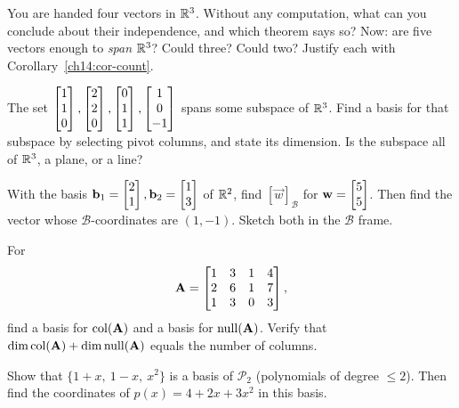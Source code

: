 \begin{exercise}
\label{ch14:exr-count}
You are handed four vectors in $\mathbb{R}^3$. Without any computation, what can you
conclude about their independence, and which theorem says so? Now: are five
vectors enough to \emph{span} $\mathbb{R}^3$? Could three? Could two? Justify each with
Corollary~\ref{ch14:cor-count}.
\end{exercise}

\begin{exercise}
\label{ch14:exr-trim}
The set $\begin{bmatrix}1\\1\\0\end{bmatrix},\begin{bmatrix}2\\2\\0\end{bmatrix},\begin{bmatrix}0\\1\\1\end{bmatrix},\begin{bmatrix}1\\0\\-1\end{bmatrix}$
spans some subspace of $\mathbb{R}^3$. Find a basis for that subspace by selecting pivot
columns, and state its dimension. Is the subspace all of $\mathbb{R}^3$, a plane, or a
line?
\end{exercise}

\begin{exercise}[Coordinates]
\label{ch14:exr-coords}
With the basis $\mathbf{b}_1=\begin{bmatrix}2\\1\end{bmatrix},\mathbf{b}_2=\begin{bmatrix}1\\3\end{bmatrix}$ of $\mathbb{R}^2$, find
$[\vec{w}]_{\mathcal B}$ for $\mathbf{w}=\begin{bmatrix}5\\5\end{bmatrix}$. Then find the vector whose
$\mathcal B$-coordinates are $(1,-1)$. Sketch both in the $\mathcal B$ frame.
\end{exercise}

\begin{exercise}
\label{ch14:exr-both}
For
\[
  \mathbf{A}=\begin{bmatrix} 1 & 3 & 1 & 4\\ 2 & 6 & 1 & 7\\ 1 & 3 & 0 & 3\end{bmatrix},
\]
find a basis for $\operatorname{col}(\mathbf{A})$ and a basis for $\operatorname{null}(\mathbf{A})$. Verify that
$\operatorname{dim}\operatorname{col}(\mathbf{A}) + \operatorname{dim}\operatorname{null}(\mathbf{A})$ equals the number of columns.
\end{exercise}

\begin{exercise}
\label{ch14:exr-poly}
Show that $\{1+x,\ 1-x,\ x^2\}$ is a basis of $\mathcal P_2$ (polynomials of
degree $\le 2$). Then find the coordinates of $p(x) = 4 + 2x + 3x^2$ in this
basis.
\end{exercise}

